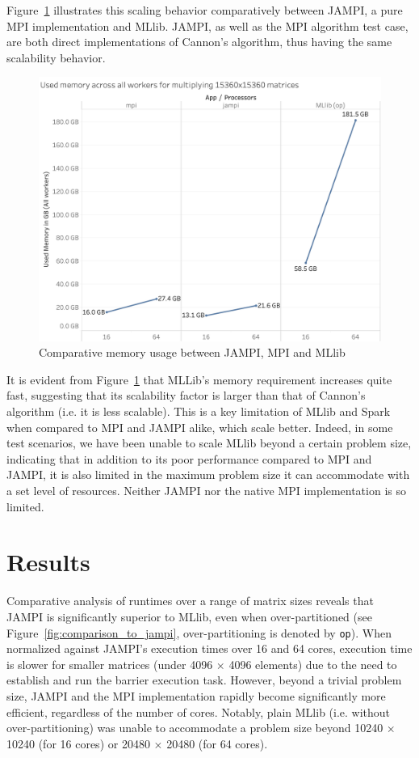 \documentclass[fleqn,10pt]{SelfArx} %
\begin{document}
Figure~\ref{fig:memory_usage} illustrates this scaling behavior comparatively between JAMPI, a pure MPI implementation and MLlib. JAMPI, as well as the MPI algorithm test case, are both direct implementations of Cannon's algorithm, thus having the same scalability behavior. 

\begin{figure}
	\centering
	\includegraphics[width=0.9\linewidth]{figures/memory.png}
	\vspace{14pt}
	\caption{Comparative memory usage between JAMPI, MPI and MLlib}
	\label{fig:memory_usage}
\end{figure}

It is evident from Figure~\ref{fig:memory_usage} that MLLib's memory requirement increases quite fast, suggesting that its scalability factor is larger than that of Cannon's algorithm (i.e. it is less scalable). This is a key limitation of MLlib and Spark when compared to MPI and JAMPI alike, which scale better. Indeed, in some test scenarios, we have been unable to scale MLlib beyond a certain problem size, indicating that in addition to its poor performance compared to MPI and JAMPI, it is also limited in the maximum problem size it can accommodate with a set level of resources. Neither JAMPI nor the native MPI implementation is so limited.


\section{Results} %
\label{sec:results}

Comparative analysis of runtimes over a range of matrix sizes reveals that JAMPI is significantly superior to MLlib, even when over-partitioned (see Figure~\ref{fig:comparison_to_jampi}, over-partitioning is denoted by \texttt{op}). When normalized against JAMPI's execution times over 16 and 64 cores, execution time is slower for smaller matrices (under 4096 $\times$ 4096 elements) due to the need to establish and run the barrier execution task. However, beyond a trivial problem size, JAMPI and the MPI implementation rapidly become significantly more efficient, regardless of the number of cores. Notably, plain MLlib (i.e. without over-partitioning) was unable to accommodate a problem size beyond 10240 $\times$ 10240 (for 16 cores) or 20480 $\times$ 20480 (for 64 cores).
\end{document}
